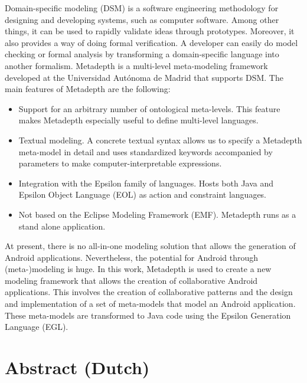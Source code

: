 Domain-specific modeling (DSM) is a software engineering methodology for designing and developing systems, such as computer software. Among other things, it can be used to rapidly validate ideas through prototypes. Moreover, it also provides a way of doing formal verification. A developer can easily do model checking or formal analysis by transforming a domain-specific language into another formalism. Metadepth is a multi-level meta-modeling framework developed at the Universidad Aut\'onoma de Madrid that supports DSM. The main features of Metadepth are the following:
\begin{itemize}
\item{Support for an arbitrary number of ontological meta-levels. This feature makes Metadepth especially useful to define multi-level languages.}
\item{Textual modeling. A concrete textual syntax allows us to specify a Metadepth meta-model in detail and uses standardized keywords accompanied by parameters to make computer-interpretable expressions.}
\item{Integration with the Epsilon family of languages. Hosts both Java and Epsilon Object Language (EOL) as action and constraint languages.}
\item{Not based on the Eclipse Modeling Framework (EMF). Metadepth runs as a stand alone application.}
\end{itemize}
At present, there is no all-in-one modeling solution that allows the generation of Android applications. Nevertheless, the potential for Android through (meta-)modeling is huge. In this work, Metadepth is used to create a new modeling framework that allows the creation of collaborative Android applications. This involves the creation of collaborative patterns and the design and implementation of a set of meta-models that model an Android application. These meta-models are transformed to Java code using the Epsilon Generation Language (EGL). 

\chapter*{Abstract (Dutch)}

